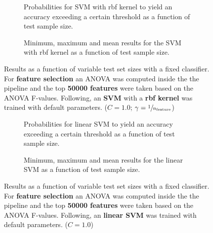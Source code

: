 \begin{figure}
    \captionsetup[subfigure]{justification=justified,singlelinecheck=false}
    \begin{subfigure}[t]{0.61\textwidth}
        
        \caption{Probabilities for SVM with rbf kernel to yield an accuracy exceeding a certain threshold as a function of test sample size.}
    \end{subfigure}
    \hspace{3.0mm}
    \begin{subfigure}[t]{0.34\textwidth}
        
        \caption{Minimum, maximum and mean results for the SVM with rbf kernel as a function of test sample size.}
    \end{subfigure}
    \caption[Effects of varying test sample size. SVM (kernel = rbf); Preprocessing: ANOVA feature selection ($k_\text{best} = \num{50000}$)]{Results as a function of variable test set sizes with a fixed classifier. For \textbf{feature selection} an ANOVA was computed inside the the pipeline and the top \textbf{\num{50000} features} were taken based on the ANOVA F-values. Following, an \textbf{{SVM}} with a \textbf{{rbf kernel}} was trained with default parameters. ($C=\num{1.0}$; $\gamma=\sfrac{1}{n_\text{feature}}$)}
    \label{fig:no_PCA_50000_best_selected_SVC}
\end{figure}

\begin{figure}
    \captionsetup[subfigure]{justification=justified,singlelinecheck=false}
    \begin{subfigure}[t]{0.61\textwidth}
        
        \caption{Probabilities for linear SVM to yield an accuracy exceeding a certain threshold as a function of test sample size.}
    \end{subfigure}
    \hspace{3.0mm}
    \begin{subfigure}[t]{0.34\textwidth}
        
        \caption{Minimum, maximum and mean results for the linear SVM as a function of test sample size.}
    \end{subfigure}
    \caption[Effects of varying test sample size. Linear SVM; Preprocessing: ANOVA feature selection ($k_\text{best} = \num{50000}$)]{Results as a function of variable test set sizes with a fixed classifier. For \textbf{feature selection} an ANOVA was computed inside the the pipeline and the top \textbf{\num{50000} features} were taken based on the ANOVA F-values. Following, an \textbf{{linear SVM}} was trained with default parameters. ($C=\num{1.0}$)}
    \label{fig:no_PCA_50000_best_selected_LinearSVC}
\end{figure}

